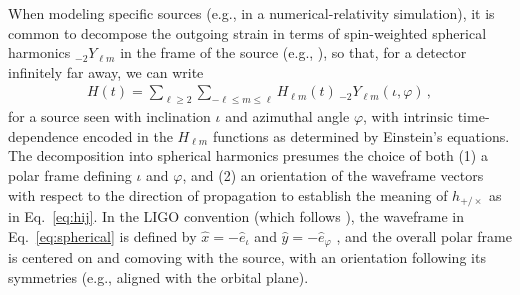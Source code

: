 \documentclass[aps,prd,twocolumn,superscriptaddress,preprintnumbers,floatfix,nofootinbib]{revtex4-2}
\newcommand*{\eq}[1]{Eq.~\eqref{eq:#1}}
\begin{document}
When modeling specific sources (e.g., in a numerical-relativity simulation), it is common to decompose the outgoing strain in terms of spin-weighted spherical harmonics ${}_{-2} Y_{\ell m}$ in the frame of the source (e.g., \cite{Kidder:2007rt}), so that, for a detector infinitely far away, we can write
\begin{align} \label{eq:spherical}
H(t) = \sum_{\ell \geq 2} \sum_{-\ell \leq m \leq \ell} H_{\ell m}(t)\, {}_{-2}Y_{\ell m} (\iota, \varphi)\, ,
\end{align}
for a source seen with inclination $\iota$ and azimuthal angle $\varphi$, with intrinsic time-dependence encoded in the $H_{\ell m}$ functions as determined by Einstein's equations.
The decomposition into spherical harmonics presumes the choice of both (1) a polar frame defining $\iota$ and $\varphi$, and (2) an orientation of the waveframe vectors with respect to the direction of propagation to establish the meaning of $h_{+/\times}$ as in \eq{hij}.
In the LIGO convention (which follows \cite{Blanchet:2008je,Faye:2012we}), the waveframe in \eq{spherical} is defined by $\hat{x} = -\hat{e}_\iota$ and $\hat{y} = - \hat{e}_\varphi$ \cite{LALSuite:source}, and the overall polar frame is centered on and comoving with the source, with an orientation following its symmetries (e.g., aligned with the orbital plane).
\end{document}
